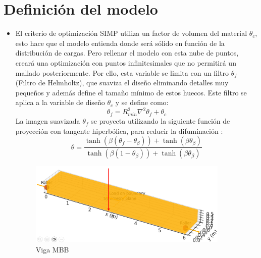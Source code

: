\documentclass{article}
\theoremstyle{mytheoremstyle}
\theoremstyle{mytheoremstyle}
\theoremstyle{myproblemstyle}
\begin{document}
\section{Definición del modelo}
    \begin{itemize}
        \item El criterio de optimización SIMP utiliza un factor de volumen del material $\theta_c$, esto hace que el modelo entienda donde será sólido en función de la distribución de cargas. Pero rellenar el modelo con esta nube de puntos, creará una optimización con puntos infinitesimales que no permitirá un mallado posteriormente. Por ello, esta variable se limita con un filtro $\theta_f$ (Filtro de Helmholtz), que suaviza el diseño eliminando detalles muy pequeños y además define el tamaño mínimo de estos huecos. Este filtro se aplica a la variable de diseño $\theta_c$ y se define como: 
        \begin{equation}
                \theta_f = R_{min}^2 \nabla^2 \theta_f + \theta_c
                \label{eq:filtro_helmholtz}
             \end{equation}
             La imagen suavizada $\theta_f$ se proyecta utilizando la siguiente función de proyección con tangente hiperbólica, para reducir la difuminación :
             \begin{equation}
             \theta = \frac{\tanh(\beta(\theta_f - \theta_\beta)) + \tanh(\beta\theta_\beta)}{\tanh(\beta(1 - \theta_\beta)) + \tanh(\beta\theta_\beta)}
             \end{equation}
            \begin{figure}[H]
              \centering
              \includegraphics[width=0.9\textwidth]{2.png}
              \caption{Viga MBB}
              \label{fig:imagen_x}
            \end{figure}


\end{itemize}
\end{document}
